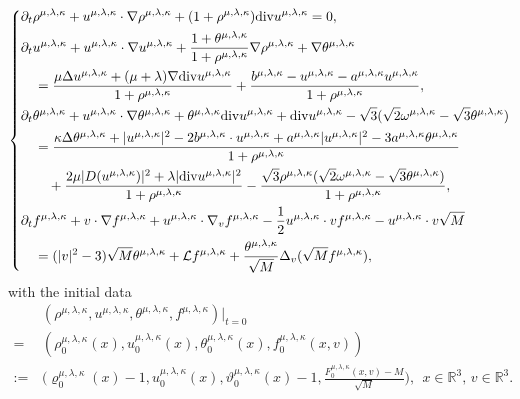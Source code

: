 \documentclass[reqno,11pt]{amsart}
\theoremstyle{plain}
\numberwithin{equation}{section}
\begin{document}
\begin{equation}\label{Q1}
\left\{\begin{aligned}
&\partial_t \rho^{\mu,\lambda,\kappa} +u^{\mu,\lambda,\kappa} 
\cdot \nabla \rho^{\mu,\lambda,\kappa}+(1+\rho^{\mu,\lambda,\kappa}) 
{\rm div} u^{\mu,\lambda,\kappa}=0, \\
&\partial_t u^{\mu,\lambda,\kappa} +u^{\mu,\lambda,\kappa} 
\cdot \nabla u^{\mu,\lambda,\kappa}
+\frac{1+\theta^{\mu,\lambda,\kappa}}{1+\rho^{\mu,\lambda,\kappa}} \nabla \rho^{\mu,\lambda,\kappa}
+\nabla \theta^{\mu,\lambda,\kappa}\\
&\quad=\frac{ \mu\Delta  u^{\mu,\lambda,\kappa}
+(\mu+\lambda)\nabla{\rm div}  u^{\mu,\lambda,\kappa} }{1+\rho^{\mu,\lambda,\kappa}}  
+\frac{b^{\mu,\lambda,\kappa}-u^{\mu,\lambda,\kappa}
-a^{\mu,\lambda,\kappa} u^{\mu,\lambda,\kappa}}{1+\rho^{\mu,\lambda,\kappa}}, \\
&\partial_t \theta^{\mu,\lambda,\kappa} +u^{\mu,\lambda,\kappa} 
\cdot \nabla \theta^{\mu,\lambda,\kappa}+\theta^{\mu,\lambda,\kappa} 
 {\rm div} u^{\mu,\lambda,\kappa}+{\rm div} u^{\mu,\lambda,\kappa}
 -\sqrt{3}(\sqrt{2} \omega^{\mu,\lambda,\kappa}-\sqrt{3} \theta^{\mu,\lambda,\kappa})  \\
&\quad =\frac{ \kappa\Delta  \theta^{\mu,\lambda,\kappa}
+|u^{\mu,\lambda,\kappa}|^2-2 b^{\mu,\lambda,\kappa} \cdot u^{\mu,\lambda,
\kappa}+a^{\mu,\lambda,\kappa}|u^{\mu,\lambda,\kappa}|^2-3 a^{\mu,\lambda,\kappa}
 \theta^{\mu,\lambda,\kappa}  }{1+\rho^{\mu,\lambda,\kappa}}  \\
&\qquad + \frac{2\mu |D(u^{\mu,\lambda,\kappa})|^2+\lambda|{\rm div}  
u^{\mu,\lambda,\kappa}|^2 }{1+\rho^{\mu,\lambda,\kappa}}
-\frac{\sqrt{3}\rho^{\mu,\lambda,\kappa}(\sqrt{2} 
\omega^{\mu,\lambda,\kappa}-\sqrt{3} \theta^{\mu,\lambda,\kappa})}{1+\rho^{\mu,\lambda,\kappa}},\\
&\partial_t f^{\mu,\lambda,\kappa} +v \cdot \nabla 
f^{\mu,\lambda,\kappa}+u^{\mu,\lambda,\kappa} \cdot \nabla_v 
f^{\mu,\lambda,\kappa}-\frac{1}{2} u^{\mu,\lambda,\kappa} \cdot v f^{\mu,\lambda,\kappa}-
u^{\mu,\lambda,\kappa} \cdot v \sqrt{M}  \\
&\quad = (|v|^2-3 ) \sqrt{M} \theta^{\mu,\lambda,\kappa}
+\mathcal{L} f^{\mu,\lambda,\kappa}+\frac{\theta^{\mu,\lambda,\kappa}}{\sqrt{M}} 
\Delta_v(\sqrt{M} f^{\mu,\lambda,\kappa}), \\
\end{aligned}\right.
\end{equation}
with the initial data
\begin{align}\label{Q1-1}
&(\rho^{\mu,\lambda,\kappa},u^{\mu,\lambda,\kappa},
\theta^{\mu,\lambda,\kappa},f^{\mu,\lambda,\kappa})|_{t=0}  \nonumber\\
= \,&(\rho^{\mu,\lambda,\kappa}_0(x),u^{\mu,\lambda,\kappa}_0(x),
\theta^{\mu,\lambda,\kappa}_0(x),f^{\mu,\lambda,\kappa}_0(x,v))\nonumber\\
:=\,&\Big( \varrho_0^{\mu,\lambda,\kappa}(x)-1,u^{\mu,\lambda,
\kappa}_0(x), {\vartheta}^{\mu,\lambda,\kappa}_0(x)-1,
\frac{F^{\mu,\lambda,\kappa}_0(x,v)-M}{\sqrt{M}}\Big),
 \ \  x \in \mathbb{R}^3, \, v\in\mathbb{R}^3. \qquad 
\end{align}
  
\end{document}
